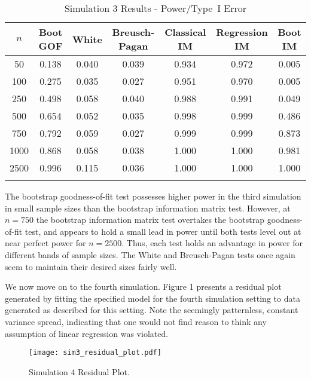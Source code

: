 \documentclass[sn-mathphys-ay]{sn-jnl}
\begin{document}
\begin{table}[h]
\caption{Simulation 3 Results - Power/Type~I Error}\label{sim3tab}%
\begin{tabular}{ c|c|c|c|c|c|c}
\toprule
$n$ & Boot GOF & White & Breusch-Pagan & Classical IM & Regression IM & Boot IM \\
\midrule
50 & 0.138 & 0.040 & 0.039 & 0.934 & 0.972 & 0.005 \\
100 & 0.275 & 0.035 & 0.027 & 0.951 & 0.970 & 0.005 \\
250 & 0.498 & 0.058 & 0.040 & 0.988 & 0.991 & 0.049 \\
500 & 0.654 & 0.052 & 0.035 & 0.998 & 0.999 & 0.486 \\
750 & 0.792 & 0.059 & 0.027 & 0.999 & 0.999 & 0.873 \\
1000 & 0.868 & 0.058 & 0.038 & 1.000 & 1.000 & 0.981 \\
2500 & 0.996 & 0.115 & 0.036 & 1.000 & 1.000 & 1.000 \\
\botrule
\end{tabular}

\end{table}

The bootstrap goodness-of-fit test possesses higher power in the third simulation in small sample sizes than the bootstrap information matrix test. However, at $n = 750$ the bootstrap information matrix test
overtakes the bootstrap goodness-of-fit test, and appears to hold a small lead in power until both tests level out at near perfect power for $n = 2500$. Thus, each test holds an advantage in power for different bands of sample sizes.
The White and Breusch-Pagan tests once again seem to maintain their desired sizes fairly well.

We now move on to the fourth simulation. Figure 1 presents a residual plot generated by fitting the specified model for the fourth simulation setting to data generated as described for this setting.
Note the seemingly patternless, constant variance spread, indicating that one would not find reason to think any assumption of linear regression was violated. 

\begin{figure}[H]
\texttt{[image: sim3\_residual\_plot.pdf]}\par
\caption{Simulation 4 Residual Plot.}
\centering
\end{figure}
\end{document}
